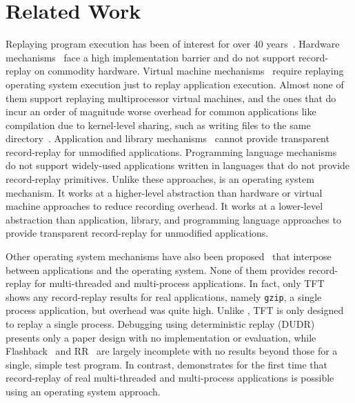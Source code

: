 \section{Related Work}
\label{scribe:sec:related}

Replaying program execution has been of interest for over 40
years~\cite{exdams}.  Hardware
mechanisms~\cite{hwrr,dmp,rerun,delorean,capo,strata,bugnet,fdr}
face a high implementation barrier and do not support record-replay on
commodity hardware.  Virtual machine
mechanisms~\cite{bressoud,revirt,smp-revirt,vmware}
require replaying operating system execution just to replay
application execution.  Almost none of them support replaying
multiprocessor virtual machines, and the ones that do incur an order
of magnitude worse overhead for common applications like
compilation due to kernel-level sharing, such as writing files to the
same directory~\cite{smp-revirt}.  Application and 
library mechanisms~\cite{liblog,r2:osdi,kendo,jockey} cannot provide
transparent record-replay for unmodified applications.  Programming
language mechanisms~\cite{dejavu,instant-replay,replay-pldi} do not
support widely-used applications written in languages that do not
provide record-replay primitives.  Unlike these approaches, \scribe{}
is an operating system mechanism.  It works at a higher-level
abstraction than hardware or virtual machine approaches to reduce
recording overhead.  It works at a lower-level abstraction than
application, library, and programming language approaches to provide
transparent record-replay for unmodified applications.

Other operating system mechanisms have also been
proposed~\cite{rr,bressoud-tft,flashback,rr-realtime} that interpose
between applications and the operating system.  None of them
provides record-replay for multi-threaded and
multi-process applications.  In fact, only TFT~\cite{bressoud-tft}
shows any record-replay results for real applications, namely 
{\tt gzip}, a single process application, but overhead was
quite high.  Unlike \scribe{}, TFT is only designed to replay a single
process.  Debugging using deterministic replay (DUDR)~\cite{rr-realtime}
presents only a paper design with no implementation or evaluation,
while Flashback~\cite{flashback} and RR~\cite{rr} are largely
incomplete with no results beyond those for a single, simple test
program.  In contrast, \scribe{} demonstrates for the first time that
record-replay of real multi-threaded and multi-process applications is
possible using an operating system approach.  

